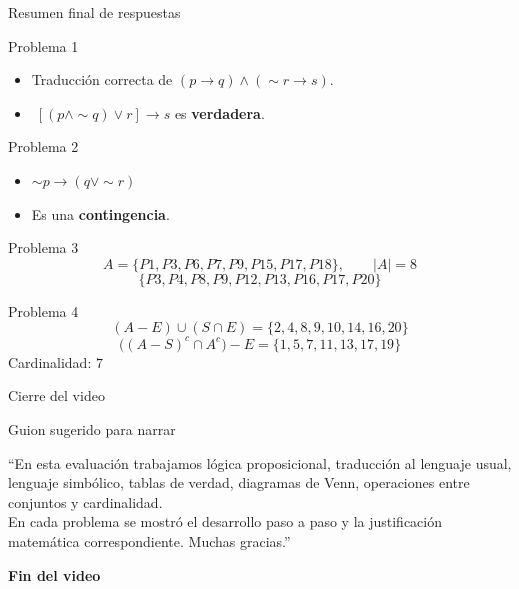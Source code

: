 \documentclass[aspectratio=169,10pt]{beamer}
\newcommand{\Guion}[1]{
	\begin{exampleblock}{Guion sugerido para narrar}
		#1
	\end{exampleblock}
}
\begin{document}
	\begin{frame}{Resumen final de respuestas}
		\small
		\begin{block}{Problema 1}
			\begin{itemize}
				\item[a)] Traducción correcta de \((p\to q)\land(\sim r\to s)\).
				\item[b)] \(\;[(p\land \sim q)\lor r]\to s\) es \textbf{verdadera}.
			\end{itemize}
		\end{block}
		
		\begin{block}{Problema 2}
			\begin{itemize}
				\item[a)] \(\sim p\to(q\lor \sim r)\)
				\item[b)] Es una \textbf{contingencia}.
			\end{itemize}
		\end{block}
		
		\begin{block}{Problema 3}
			\[
			A=\{P1,P3,P6,P7,P9,P15,P17,P18\},\qquad |A|=8
			\]
			\[
			\{P3,P4,P8,P9,P12,P13,P16,P17,P20\}
			\]
		\end{block}
		
		\begin{block}{Problema 4}
			\[
			(A-E)\cup(S\cap E)=\{2,4,8,9,10,14,16,20\}
			\]
			\[
			\big((A-S)^c\cap A^c\big)-E=\{1,5,7,11,13,17,19\}
			\]
			Cardinalidad: \(7\)
		\end{block}
		\normalsize
	\end{frame}
	
	\begin{frame}{Cierre del video}
		\Guion{
			``En esta evaluación trabajamos lógica proposicional, traducción al lenguaje usual, lenguaje simbólico, tablas de verdad, diagramas de Venn, operaciones entre conjuntos y cardinalidad.\\[0.2cm]
			En cada problema se mostró el desarrollo paso a paso y la justificación matemática correspondiente. Muchas gracias.''}
		
		\vfill
		\begin{center}
			{\Large \textbf{Fin del video}}
		\end{center}
	\end{frame}
	
\end{document}
